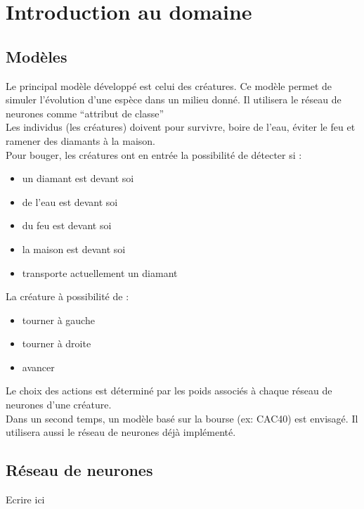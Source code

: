 \chapter{Introduction au domaine}

\section{Modèles}
Le principal modèle développé est celui des créatures.
Ce modèle permet de simuler l'évolution d'une espèce dans un milieu donné.
Il utilisera le réseau de neurones comme ``attribut de classe''\\
Les individus (les créatures) doivent pour survivre, boire de l'eau, éviter le feu et ramener des diamants à la maison.
\\Pour bouger, les créatures ont en entrée la possibilité de détecter si :\\

\begin{itemize}
 \item un diamant est devant soi
 \item de l'eau est devant soi
 \item du feu est devant soi
 \item la maison est devant soi
 \item transporte actuellement un diamant\\
\end{itemize}

La créature à possibilité de :
\begin{itemize}
 \item tourner à gauche
 \item tourner à droite
 \item avancer\\
 
 \end{itemize}
 
 Le choix des actions est déterminé par les poids associés à chaque réseau de neurones d'une créature.\\

Dans un second temps, un modèle basé sur la bourse (ex: CAC40) est envisagé.
Il utilisera aussi le réseau de neurones déjà implémenté.

\section{Réseau de neurones}
Ecrire ici

   

